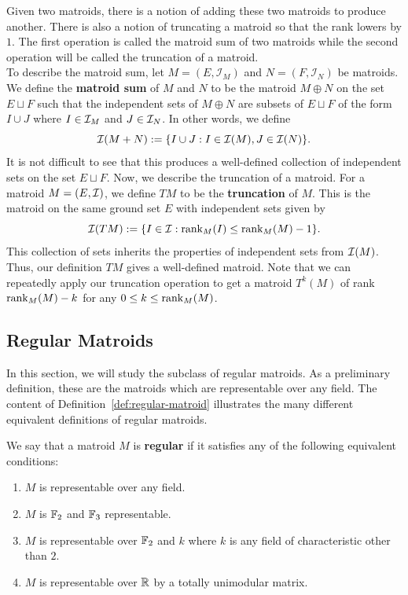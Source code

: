 \documentclass{puthesis-UG}
\begin{document}
Given two matroids, there is a notion of adding these two matroids to produce another. There is also a notion of truncating a matroid so that the rank lowers by $1$. The first operation is called the matroid sum of two matroids while the second operation will be called the truncation of a matroid. \\

To describe the matroid sum, let $M = (E, \mathcal{I}_M)$ and $N = (F, \mathcal{I}_N)$ be matroids. We define the \textbf{matroid sum} of $M$ and $N$ to be the matroid $M \oplus N$ on the set $E \sqcup F$ such that the independent sets of $M\oplus N$ are subsets of $E \sqcup F$ of the form $I \cup J$ where $I \in \mathcal{I}_M$ and $J \in \mathcal{I}_N$. In other words, we define
\[
	\mathcal{I}(M+N) := \{I \cup J : I \in \mathcal{I}(M), J \in \mathcal{I}(N)\}.
\]
It is not difficult to see that this produces a well-defined collection of independent sets on the set $E \sqcup F$. Now, we describe the truncation of a matroid. For a matroid $M = (E, \mathcal{I})$, we define $TM$ to be the \textbf{truncation} of $M$. This is the matroid on the same ground set $E$ with independent sets given by 
\[
	\mathcal{I}(TM) := \{I \in \mathcal{I} : \operatorname{rank}_M(I) \leq \operatorname{rank}_M(M) - 1\}.
\]
This collection of sets inherits the properties of independent sets from $\mathcal{I}(M)$. Thus, our definition $TM$ gives a well-defined matroid. Note that we can repeatedly apply our truncation operation to get a matroid $T^k(M)$ of rank $\operatorname{rank}_M(M) - k$ for any $0 \leq k \leq \operatorname{rank}_M(M)$. 

\subsection{Regular Matroids} \label{sec:regular-matroids}

In this section, we will study the subclass of regular matroids. As a preliminary definition, these are the matroids which are representable over any field. The content of Definition~\ref{def:regular-matroid} illustrates the many different equivalent definitions of regular matroids. 

\begin{defn} \label{def:regular-matroid}
	We say that a matroid $M$ is \textbf{regular} if it satisfies any of the following equivalent conditions:
	\begin{enumerate}[label = (\alph*)]
		\item $M$ is representable over any field. 
		\item $M$ is $\mathbb{F}_2$ and $\mathbb{F}_3$ representable. 
		\item $M$ is representable over $\mathbb{F}_2$ and $k$ where $k$ is any field of characteristic other than $2$.
		\item $M$ is representable over $\mathbb{R}$ by a totally unimodular matrix. 
	\end{enumerate}
\end{defn}
\end{document}

